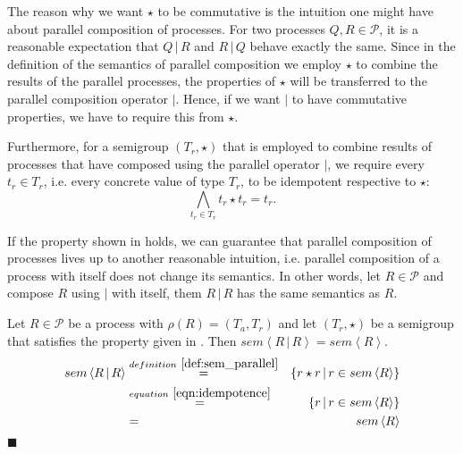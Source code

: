 The reason why we want $\star$ to be commutative is the intuition one might have about parallel composition of processes. For two processes $Q, R \in \mathcal{P}$, it is a reasonable expectation that $Q \,|\, R$ and $R \,|\, Q$ behave exactly the same. Since in the definition of the semantics of parallel composition we employ $\star$ to combine the results of the parallel processes, the properties of $\star$ will be transferred to the parallel composition operator $|$. Hence, if we want $|$ to have commutative properties, we have to require this from $\star$.

Furthermore, for a semigroup $\left(T_r, \star \right)$ that is employed to combine results of processes that have composed using the parallel operator $|$, we require every $t_r \in T_r$, i.e. every concrete value of type $T_r$, to be idempotent respective to $\star$:
\begin{equation}
  \label{eqn:idempotence}
  \bigwedge_{t_r \in T_r} t_r \star t_r = t_r.
\end{equation}

\begin{theorem}
If the property shown in  holds, we can guarantee that parallel composition of processes lives up to another reasonable intuition, i.e. parallel composition of a process with itself does not change its semantics. In other words, let $R \in \mathcal{P}$ and compose $R$ using $|$ with itself, them $R \,|\, R$ has the same semantics as $R$.
\end{theorem}

\begin{myproof}
Let $R \in \mathcal{P}$ be a process with $\rho \left( R \right) = \left( T_a, T_r \right)$ and let $\left( T_r, \star \right)$ be a semigroup that satisfies the property given in . Then $sem \left\langle R \,|\, R \right\rangle = sem \left\langle R \right\rangle$.
  \begin{eqnarray*}
    sem \left\langle R \,|\, R \right\rangle & \overset{\defref{def:sem_parallel}}{=} & \left\{ r \star r \,|\, r \in sem \left\langle R \right\rangle \right\} \\
    & \overset{\eqnref{eqn:idempotence}}{=} & \left\{ r \,|\, r \in sem \left\langle R \right\rangle \right\} \\
    & = & sem \left\langle R \right\rangle 
  \end{eqnarray*}
  \hfill$\blacksquare$
\end{myproof}




